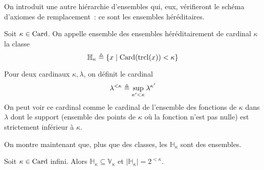 On introduit une autre hiérarchie d'ensembles qui, eux, vérifieront le schéma
d'axiomes de remplacement~: ce sont les ensembles héréditaires.

\begin{definition}
  Soit $\kappa \in \operatorname{Card}$. On appelle ensemble des ensembles héréditairement de
  cardinal $\kappa$ la classe
  \[\mathbb H_\kappa \triangleq \{x \mid \operatorname{Card}(\operatorname{trcl}(x)) < \kappa\}\]
\end{definition}

Pour deux cardinaux $\kappa,\lambda$, on définit le cardinal
\[\lambda^{<\kappa} \triangleq \sup_{\kappa' < \kappa} \lambda^{\kappa'}\]
On peut voir ce cardinal comme le cardinal de l'ensemble des fonctions de
$\kappa$ dans $\lambda$ dont le support (ensemble des points de $\kappa$ où la
fonction n'est pas nulle) est strictement inférieur à $\kappa$.

On montre maintenant que, plus que des classes, les $\mathbb H_\kappa$ sont des
ensembles.

\begin{proposition}\label{prop.Hcard}
  Soit $\kappa\in\operatorname{Card}$ infini. Alors $\mathbb H_\kappa\subseteq\mathbb V_\kappa$
  et $|\mathbb H_\kappa| = 2^{<\kappa}$.
\end{proposition}

